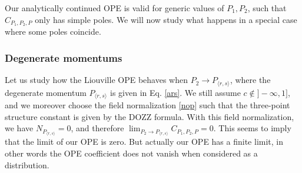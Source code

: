 \documentclass[12pt, a4paper, notitlepage, twoside]{report}
\numberwithin{equation}{section}
\theoremstyle{break}
\begin{document}
Our analytically continued OPE is valid for generic values of $P_1,P_2$, such that $C_{P_1,P_2,P}$ only has simple poles.
We will now study what happens in a special case where some poles coincide.


\subsubsection{Degenerate momentums}

Let us study how the Liouville OPE behaves when $P_2 \to P_{\langle r,s\rangle}$, where the degenerate momentum $P_{\langle r,s \rangle}$ is given in Eq. \eqref{ars}.
We still assume $c\notin ]-\infty,1]$, and we moreover choose the field normalization \eqref{nop} such that the three-point structure constant is given by the DOZZ formula. 
With this field normalization, we have $N_{P_{\langle r,s\rangle}}=0$, and therefore $\lim_{P_2 \to P_{\langle r,s\rangle}} C_{P_1,P_2,P}=0$.
This seems to imply that the limit of our OPE is zero. But actually our OPE has a finite limit, in other words the OPE coefficient does not vanish when considered as a distribution. 
\end{document}
